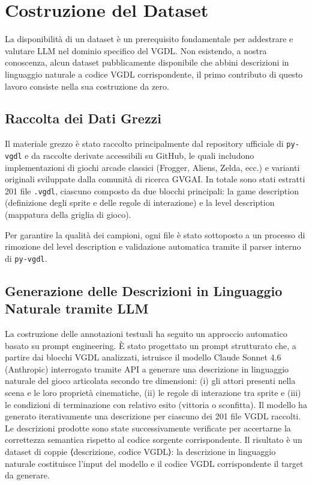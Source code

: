 \documentclass[final,5p,times,twocolumn]{elsarticle}
\begin{document}
\section{Costruzione del Dataset}

La disponibilità di un dataset è un prerequisito fondamentale per addestrare e valutare LLM nel dominio specifico del VGDL. Non esistendo, a nostra conoscenza, alcun dataset pubblicamente disponibile che abbini descrizioni in linguaggio naturale a codice VGDL corrispondente, il primo contributo di questo lavoro consiste nella sua costruzione da zero.

\subsection{Raccolta dei Dati Grezzi}

Il materiale grezzo è stato raccolto principalmente dal repository ufficiale di \texttt{py-vgdl} e da raccolte derivate accessibili su GitHub, le quali includono implementazioni di giochi arcade classici (Frogger, Aliens, Zelda, ecc.) e varianti originali sviluppate dalla comunità di ricerca GVGAI. In totale sono stati estratti 201 file \texttt{.vgdl}, ciascuno composto da due blocchi principali: la game description (definizione degli sprite e delle regole di interazione) e la level description (mappatura della griglia di gioco).

Per garantire la qualità dei campioni, ogni file è stato sottoposto a un processo di rimozione del level description e validazione automatica tramite il parser interno di \texttt{py-vgdl}.

\subsection{Generazione delle Descrizioni in Linguaggio Naturale tramite LLM}

La costruzione delle annotazioni testuali ha seguito un approccio automatico basato su prompt engineering. È stato progettato un prompt strutturato che, a partire dai blocchi VGDL analizzati, istruisce il modello Claude Sonnet 4.6 (Anthropic) interrogato tramite API a generare una descrizione in linguaggio naturale del gioco articolata secondo tre dimensioni: (i) gli attori presenti nella scena e le loro proprietà cinematiche, (ii) le regole di interazione tra sprite e (iii) le condizioni di terminazione con relativo esito (vittoria o sconfitta).
Il modello ha generato iterativamente una descrizione per ciascuno dei 201 file VGDL raccolti. Le descrizioni prodotte sono state successivamente verificate per accertarne la correttezza semantica rispetto al codice sorgente corrispondente.
Il risultato è un dataset di coppie ⟨descrizione, codice VGDL⟩: la descrizione in linguaggio naturale costituisce l'input del modello e il codice VGDL corrispondente il target da generare.
\end{document}

